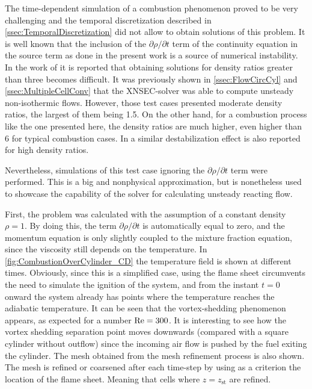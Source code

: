 The time-dependent simulation of a combustion phenomenon proved to be very challenging and the temporal discretization described in \cref{ssec:TemporalDiscretization} did not allow to obtain solutions of this problem. It is well known that the inclusion of the $\partial\rho /\partial t$ term of the continuity equation in the source term as done in the present work is a source of numerical instability. In the work of \cite{nicoudNumericalStudyChannel} it is reported that obtaining solutions for density ratios greater than three  becomes difficult. It was previously shown in \cref{ssec:FlowCircCyl} and \cref{ssec:MultipleCellConv} that the XNSEC-solver was able to compute unsteady non-isothermic flows. However, those test cases presented moderate density ratios, the largest of them being 1.5. On the other hand, for a combustion process like the one presented here, the density ratios are much higher, even higher than 6 for typical combustion cases. In \cite{rauwoensConservativeDiscreteCompatibilityconstraint2009} a similar destabilization effect is also reported for high density ratios. 

Nevertheless, simulations of this test case ignoring the  $\partial\rho /\partial t$ term were performed. This is a big and nonphysical approximation, but is nonetheless used to showcase the capability of the solver for calculating unsteady reacting flow.
 
First, the problem was calculated with the assumption of a constant density $\rho = 1$. By doing this, the term $\partial\rho /\partial t$ is automatically equal to zero, and the momentum equation is only slightly coupled to the mixture fraction equation, since the viscosity still depends on the temperature. 
In \cref{fig:CombustionOverCylinder_CD} the temperature field is shown at different times. Obviously, since this is a simplified case, using the flame sheet circumvents the need to simulate the ignition of the system, and from the instant $t=0$ onward the system already has points where the temperature reaches the adiabatic temperature. It can be seen that the vortex-shedding phenomenon appears, as expected for a number $ \text{Re} = 300$. It is interesting to see how the vortex shedding separation point moves downwards (compared with a square cylinder without outflow) since the incoming air flow is pushed by the fuel exiting the cylinder. The mesh obtained from the mesh refinement process is also shown. The mesh is refined or coarsened after each time-step by using as a criterion the location of the flame sheet. Meaning that cells where $z = z_{\text{st}}$ are refined.

